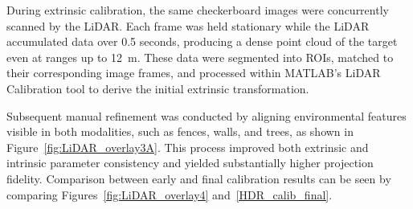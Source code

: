 \documentclass{erauthesis}
\begin{document}

During extrinsic calibration, the same checkerboard images were concurrently scanned by the LiDAR.  
Each frame was held stationary while the LiDAR accumulated data over 0.5 seconds, producing a dense point cloud of the target even at ranges up to 12~m.  
These data were segmented into \acp{ROI}, matched to their corresponding image frames, and processed within MATLAB’s LiDAR Calibration tool \cite{matlab_calibration} to derive the initial extrinsic transformation.


Subsequent manual refinement was conducted by aligning environmental features visible in both modalities, such as fences, walls, and trees, as shown in Figure~\ref{fig:LiDAR_overlay3A}.  
This process improved both extrinsic and intrinsic parameter consistency and yielded substantially higher projection fidelity.  
Comparison between early and final calibration results can be seen by comparing Figures~\ref{fig:LiDAR_overlay4} and~\ref{HDR_calib_final}.

\end{document}
